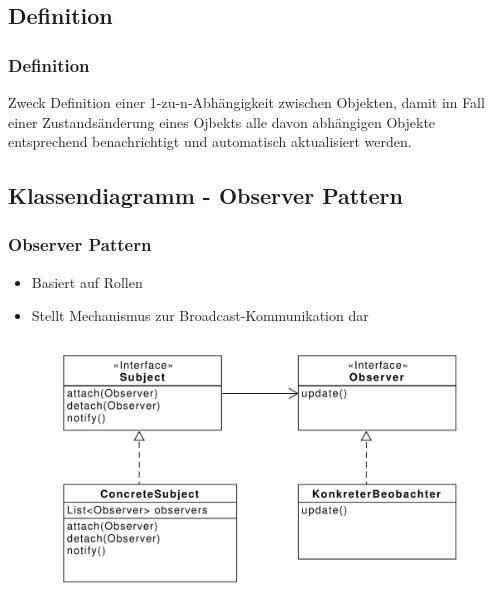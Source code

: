 \subsection{Definition}
\begin{frame}
  \frametitle{Definition}

  \begin{block}{Zweck}
  	Definition einer 1-zu-n-Abhängigkeit zwischen Objekten, damit im Fall einer Zustandsänderung eines Ojbekts alle davon abhängigen Objekte entsprechend benachrichtigt und automatisch aktualisiert werden.
  \end{block}
  
\end{frame}

\subsection{Klassendiagramm - Observer Pattern}
\begin{frame}
	\frametitle{Observer Pattern}
	\begin{itemize}
		\item Basiert auf Rollen
		\item Stellt Mechanismus zur Broadcast-Kommunikation dar
	\end{itemize}	
	
  	\begin{figure}
		\includegraphics[scale=.4]{paper/observer/observer}
	\end{figure}
\end{frame}


